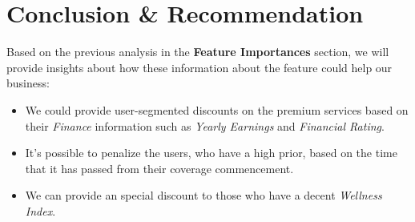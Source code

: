 \documentclass[a4paper,12pt]{article}
\begin{document}
\section{Conclusion \& Recommendation}
Based on the previous analysis in the \textbf{Feature Importances} section, we will provide insights about how these information about the feature could help our business:
\begin{itemize}
    \item We could provide user-segmented discounts on the premium services based on their \textit{Finance} information such as \textit{Yearly Earnings} and \textit{Financial Rating}.
    \item It's possible to penalize the users, who have a high prior, based on the time that it has passed from their coverage commencement.
    \item We can provide an special discount to those who have a decent \textit{Wellness Index}.
\end{itemize}
\end{document}

